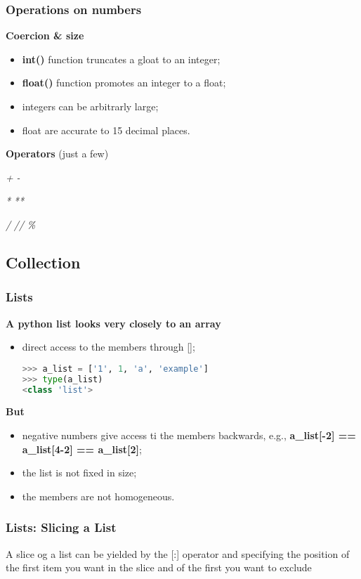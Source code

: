 \subsubsection{Operations on numbers}
\textbf{Coercion \& size}
\begin{itemize}
	\item \textbf{int()} function truncates a gloat to an integer;
	\item \textbf{float()} function promotes an integer to a float;
	\item integers can be arbitrarly large;
	\item float are accurate to 15 decimal places.
\end{itemize}
\textbf{Operators} (just a few)

\textit{+} \textit{-}

\textit{*} \textit{**}

\textit{/} \textit{//} \textit{\%}

\subsection{Collection}

\subsubsection{Lists}
\textbf{A python list looks very closely to an array}
\begin{itemize}
	\item direct access to the members through [];
\begin{lstlisting}[language=Python]
>>> a_list = ['1', 1, 'a', 'example']
>>> type(a_list)
<class 'list'>
\end{lstlisting}
\end{itemize}
\textbf{But}
\begin{itemize}
	\item negative numbers give access ti the members backwards, e.g., \textbf{a\_list[-2] == a\_list[4-2] == a\_list[2]};
	\item the list is not fixed in size;
	\item the members are not homogeneous.
\end{itemize}

\subsubsection{Lists: Slicing a List}
A slice og a list can be yielded by the [:] operator and specifying the position of the first item you want in the slice and of the first you want to exclude

